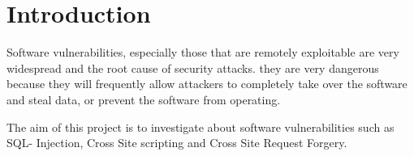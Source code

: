 \section{Introduction}

Software vulnerabilities, especially those that are remotely exploitable are very widespread and the root cause of security attacks.\cite{cESV}
they are very dangerous because they will frequently allow attackers to completely take over the software and steal data, or prevent the software from operating.\cite{introduction}

The aim of this project is to investigate about software vulnerabilities such as SQL- Injection, Cross Site scripting and Cross Site Request Forgery.









 


